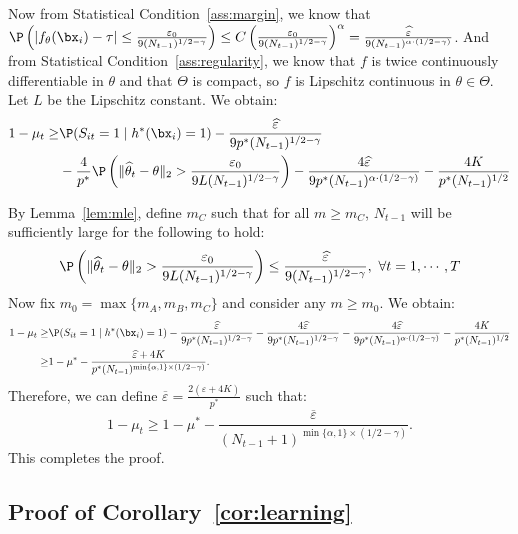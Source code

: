 \documentclass[blindrev]{informs3noheader}
\begin{document}
Now from Statistical Condition~\ref{ass:margin}, we know that $\P\left( \left|f_{\theta}(\bx_i) - \tau\right| \leq \frac{\varepsilon_0}{9(N_{t-1})^{1/2-\gamma}} \right)\leq C\left(\frac{\varepsilon_0}{9(N_{t-1})^{1/2-\gamma}}\right)^\alpha=\frac{\widehat\varepsilon}{9(N_{t-1})^{\alpha\cdot(1/2-\gamma)}}$. And from Statistical Condition~\ref{ass:regularity}, we know that $f$ is twice continuously differentiable in $\theta$ and that $\Theta$ is compact, so $f$ is Lipschitz continuous in $\theta\in\Theta$. Let $L$ be the Lipschitz constant. We obtain:
\begin{align*}
1-\mu_t\geq&\P(S_{it}=1 \mid h^*(\bx_i)=1)-\frac{\widehat\varepsilon}{9p^*(N_{t-1})^{1/2-\gamma}}\\&
-\frac{4}{p^*}\P\left( \|\widehat\theta_t-\theta\|_2 > \frac{\varepsilon_0}{9L(N_{t-1})^{1/2-\gamma}} \right)- \frac{4\widehat\varepsilon}{9p^*(N_{t-1})^{\alpha\cdot(1/2-\gamma)}}-\frac{4K}{p^*(N_{t-1})^{1/2}}
\end{align*}

By Lemma~\ref{lem:mle}, define $m_C$ such that for all $m\geq m_C$, $N_{t-1}$ will be sufficiently large for the following to hold:
\begin{equation}
    \P\left( \|\widehat\theta_t -\theta\|_2 > \frac{\varepsilon_0}{9L(N_{t-1})^{1/2-\gamma}} \right)\leq \frac{\widehat\varepsilon}{9(N_{t-1})^{1/2-\gamma}},\ \forall t=1,\cdots,T \label{eq:mle_bound2}
\end{equation}
Now fix $m_0=\max\{m_A,m_B,m_C\}$ and consider any $m\geq m_0$. We obtain:
\begin{align*}
1-\mu_t\geq&\P(S_{it}=1 \mid h^*(\bx_i)=1)-\frac{\widehat\varepsilon}{9p^*(N_{t-1})^{1/2-\gamma}}
-\frac{4\widehat\varepsilon }{9p^*(N_{t-1})^{1/2-\gamma}}- \frac{4\widehat\varepsilon}{9p^*(N_{t-1})^{\alpha\cdot(1/2-\gamma)}}-\frac{4K}{p^*(N_{t-1})^{1/2}}\\
\geq&1-\mu^*-\frac{\widehat\varepsilon+4K}{p^*(N_{t-1})^{\min\{\alpha,1\}\times (1/2-\gamma)}}.
\end{align*}
Therefore, we can define $\overline\varepsilon=\frac{2(\widehat\varepsilon+4K)}{p^*}$ such that:
\[1-\mu_t\geq 1-\mu^*-\frac{\overline\varepsilon}{(N_{t-1}+1)^{\min\{\alpha,1\}\times (1/2-\gamma)}}.\]
This completes the proof.\hfill\Halmos

\subsection{Proof of Corollary~\ref{cor:learning}}
\end{document}
